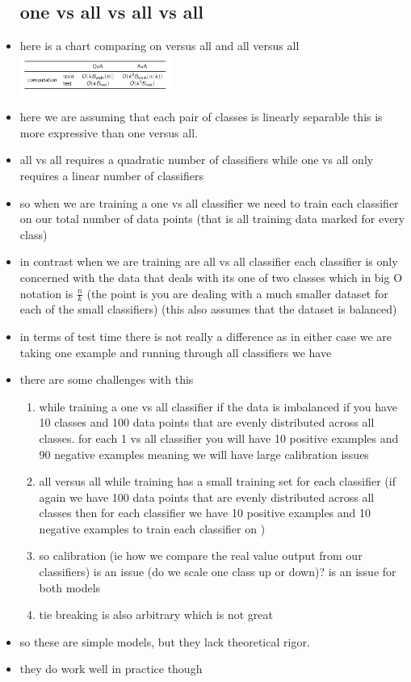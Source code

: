 \documentclass{article}
\begin{document}
\begin{itemize}
\subsection*{one vs all vs all vs all}
\item here is a chart comparing on versus all and all versus all 
\\  \includegraphics[width=5cm]{lecture_notes/lecture_8/immages/l8_4.png}
\item here we are assuming that each pair of classes is linearly separable this is more expressive than one versus all.
\item all vs all requires a quadratic number of classifiers while one vs all only requires a linear number of classifiers
\item so when we are training a one vs all classifier we need to train each classifier on our total number of data points (that is all training data marked for every class)
\item in contrast when we are training are all vs all classifier each classifier is only concerned with the data that deals with its one of two classes which in big O notation is $\frac{n}{k}$ (the point is you are dealing with a much smaller dataset for each of the small classifiers) (this also assumes that the dataset is balanced)
\item in terms of test time there is not really a difference as in either case we are taking one example and running through all classifiers we have 
\item there are some challenges with this 
\begin{enumerate}
    \item while training a one vs all classifier if the data is imbalanced if you have 10 classes and 100 data points that are evenly distributed across all classes. for each 1 vs all classifier you will have 10 positive examples and 90 negative examples meaning we will have large calibration issues
    \item all versus all while training has a small training set for each classifier (if again we have 100 data points that are evenly distributed across all classes then for each classifier we have 10 positive examples and 10 negative examples to train each classifier on )
    \item so calibration (ie how we compare the real value output from our classifiers) is an issue  (do we scale one class up or down)?  is an issue for both models
    \item tie breaking is also arbitrary which is not great 
\end{enumerate}
\item so these are simple models, but they lack theoretical rigor. 
\item they do work well in practice though 

\end{itemize}
\end{document}
